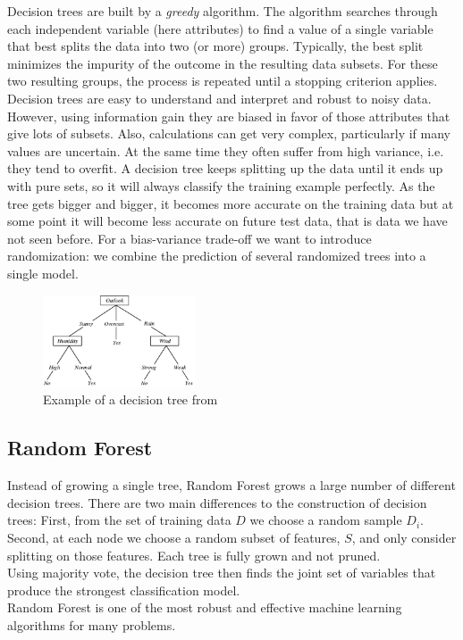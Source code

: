 \documentclass[journal, a4paper]{IEEEtran}
\begin{document}
Decision trees are built by a \textit{greedy} algorithm. 
The algorithm searches through each independent variable (here attributes) to find a value of a single variable that best splits the data into two (or more) groups. Typically, the best split minimizes the impurity of the outcome in the resulting data subsets. For these two resulting groups, the process is repeated until a stopping criterion applies.  \\
Decision trees are easy to understand and interpret and robust to noisy data. However, using information gain they are biased in favor of those attributes that give lots of subsets. Also, calculations can get very complex, particularly if many values are uncertain. At the same time they often suffer from high variance, i.e. they tend to overfit. A decision tree keeps splitting up the data until it ends up with pure sets, so it will always classify the training example perfectly. As the tree gets bigger and bigger, it becomes more accurate on the training data but at some point it will become less accurate on future test data, that is data we have not seen before. For a bias-variance trade-off we want to introduce randomization: we combine the prediction of several randomized trees into a single model.

\begin{figure}[!ht]
	\centering
  \includegraphics[width=0.4\textwidth]{ID3.png}
	\caption{Example of a decision tree from \cite{decisiontree}}
	\label{decisiontree}
\end{figure}

\subsection{Random Forest}

Instead of growing a single tree, Random Forest grows a large number of different decision trees. There are two main differences to the construction of decision trees: First, from the set of training data \( D \) we choose a random sample \( D_{i} \). Second, at each node we choose a random subset of features, \( S \), and only consider splitting on those features. Each tree is fully grown and not pruned. \\ 
Using majority vote, the decision tree then finds the joint set of variables that produce the strongest classification model. \\
Random Forest is one of the most robust and effective machine learning algorithms for many problems. \\
\end{document}
